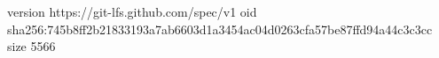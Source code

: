 version https://git-lfs.github.com/spec/v1
oid sha256:745b8ff2b21833193a7ab6603d1a3454ac04d0263cfa57be87ffd94a44c3c3cc
size 5566
